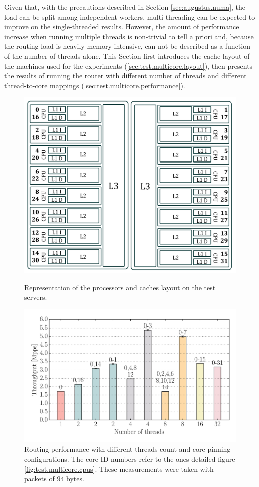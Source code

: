 \documentclass[11pt,a4paper,twoside,titlepage,openany]{book}
\begin{document}
Given that, with the precautions described in Section \ref{sec:augustus.numa}, the load can be split among independent workers, multi-threading can be expected to improve on the single-threaded results. However, the amount of performance increase when running multiple threads is non-trivial to tell a priori and, because the routing load is heavily memory-intensive, can not be described as a function of the number of threads alone. This Section first introduces the cache layout of the machines used for the experiments (\ref{sec:test.multicore.layout}), then presents the results of running the router with different number of threads and different thread-to-core mappings (\ref{sec:test.multicore.performance}).

\begin{figure}[t!]
  \centering
  \begin{minipage}{\textwidth}
    \centering
    \includegraphics[width=.7\textwidth]{img/cpus_horiz.pdf}
    \caption[Processors and caches layout on the test servers]{Representation of the processors and caches layout on the test servers.}
    \label{fig:test.multicore.cpus}
  \end{minipage}
  \begin{minipage}{\textwidth}
    \centering
    \includegraphics[width=.85\textwidth]{img/augustus_multithread.pdf}
    \caption[Routing performance with different threads count and core pinning]{Routing performance with different threads count and core pinning configurations. The core ID numbers refer to the ones detailed figure \ref{fig:test.multicore.cpus}. These measurements were taken with packets of $94$ bytes.}
    \label{fig:test.multicore.coremap}
  \end{minipage}
\end{figure}
\end{document}
